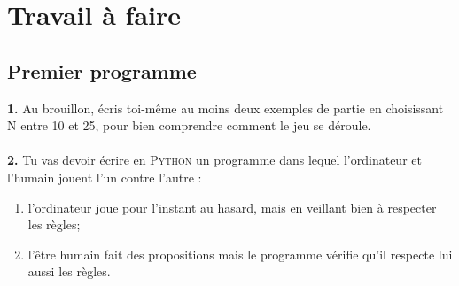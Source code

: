 \documentclass[a4paper,12pt]{book}
\begin{document}
\section*{Travail à faire}

\subsection*{Premier programme}
\textbf{1.} Au brouillon, écris toi-même au moins  deux exemples de partie en choisissant N entre 10 et 25, pour bien
comprendre comment le jeu se déroule.\\
	
	
\\
	
\textbf{2.} Tu vas devoir écrire en \textsc{Python} un programme dans lequel l'ordinateur et l'humain jouent l'un contre l'autre :
\begin{enumerate}[--]
	\item 	l'ordinateur joue pour l'instant au hasard, mais en veillant bien à respecter les règles;
	\item   l'être humain fait des propositions mais le programme vérifie qu'il respecte lui aussi les règles.
\end{enumerate}
\end{document}
